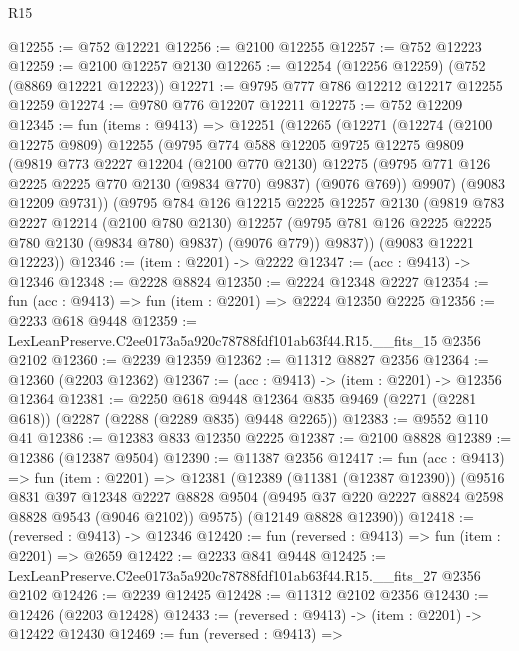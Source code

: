 \begin{lexlean}{R15}
\begin{coremodule}
@12255 := @752 @12221
@12256 := @2100 @12255
@12257 := @752 @12223
@12259 := @2100 @12257 @2130
@12265 := @12254 (@12256 @12259) (@752 (@8869 @12221 @12223))
@12271 := @9795 @777 @786 @12212 @12217 @12255 @12259
@12274 := @9780 @776 @12207 @12211
@12275 := @752 @12209
@12345 := fun (items : @9413) =>
  @12251
    (@12265
      (@12271
        (@12274
          (@2100 @12275 @9809)
          @12255
          (@9795
            @774
            @588
            @12205
            @9725
            @12275
            @9809
            (@9819
              @773
              @2227
              @12204
              (@2100 @770 @2130)
              @12275
              (@9795 @771 @126 @2225 @2225 @770 @2130 (@9834 @770) @9837)
              (@9076 @769))
            @9907)
          (@9083 @12209 @9731))
        (@9795
          @784
          @126
          @12215
          @2225
          @12257
          @2130
          (@9819
            @783
            @2227
            @12214
            (@2100 @780 @2130)
            @12257
            (@9795 @781 @126 @2225 @2225 @780 @2130 (@9834 @780) @9837)
            (@9076 @779))
          @9837))
      (@9083 @12221 @12223))
@12346 := (item : @2201) -> @2222
@12347 := (acc : @9413) -> @12346
@12348 := @2228 @8824
@12350 := @2224 @12348 @2227
@12354 := fun (acc : @9413) => fun (item : @2201) => @2224 @12350 @2225
@12356 := @2233 @618 @9448
@12359 := LexLeanPreserve.C2ee0173a5a920c78788fdf101ab63f44.R15.__fits_15 @2356 @2102
@12360 := @2239 @12359
@12362 := @11312 @8827 @2356
@12364 := @12360 (@2203 @12362)
@12367 := (acc : @9413) -> (item : @2201) -> @12356 @12364
@12381 := @2250
    @618
    @9448
    @12364
    @835
    @9469
    (@2271 (@2281 @618))
    (@2287 (@2288 (@2289 @835) @9448 @2265))
@12383 := @9552 @110 @41
@12386 := @12383 @833 @12350 @2225
@12387 := @2100 @8828
@12389 := @12386 (@12387 @9504)
@12390 := @11387 @2356
@12417 := fun (acc : @9413) =>
  fun (item : @2201) =>
  @12381
    (@12389
      (@11381 (@12387 @12390))
      (@9516
        @831
        @397
        @12348
        @2227
        @8828
        @9504
        (@9495 @37 @220 @2227 @8824 @2598 @8828 @9543 (@9046 @2102))
        @9575)
      (@12149 @8828 @12390))
@12418 := (reversed : @9413) -> @12346
@12420 := fun (reversed : @9413) => fun (item : @2201) => @2659
@12422 := @2233 @841 @9448
@12425 := LexLeanPreserve.C2ee0173a5a920c78788fdf101ab63f44.R15.__fits_27 @2356 @2102
@12426 := @2239 @12425
@12428 := @11312 @2102 @2356
@12430 := @12426 (@2203 @12428)
@12433 := (reversed : @9413) -> (item : @2201) -> @12422 @12430
@12469 := fun (reversed : @9413) =>

\end{coremodule}
\end{lexlean}
